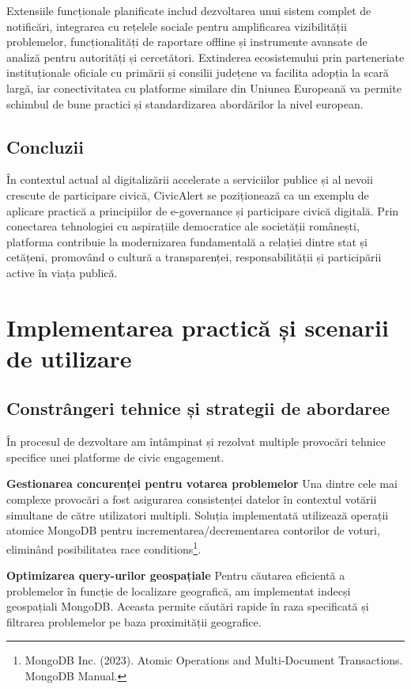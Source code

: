 \documentclass[12pt,a4paper]{report}
\begin{document}
Extensiile funcționale planificate includ dezvoltarea unui sistem complet de notificări, integrarea cu rețelele sociale pentru amplificarea vizibilității problemelor, funcționalități de raportare offline și instrumente avansate de analiză pentru autorități și cercetători. Extinderea ecosistemului prin parteneriate instituționale oficiale cu primării și consilii județene va facilita adopția la scară largă, iar conectivitatea cu platforme similare din Uniunea Europeană va permite schimbul de bune practici și standardizarea abordărilor la nivel european.

\section{Concluzii}

În contextul actual al digitalizării accelerate a serviciilor publice și al nevoii crescute de participare civică, CivicAlert se poziționează ca un exemplu de aplicare practică a principiilor de e-governance și participare civică digitală. Prin conectarea tehnologiei  cu aspirațiile democratice ale societății românești, platforma contribuie la modernizarea fundamentală a relației dintre stat și cetățeni, promovând o cultură a transparenței, responsabilității și participării active în viața publică.


\newpage
\chapter{Implementarea practică și scenarii de utilizare}


\section{Constrângeri tehnice și strategii de abordaree}

În procesul de dezvoltare am întâmpinat și rezolvat multiple provocări tehnice specifice unei platforme de civic engagement.

\textbf{Gestionarea concurenței pentru votarea problemelor}
Una dintre cele mai complexe provocări a fost asigurarea consistenței datelor în contextul votării simultane de către utilizatori multipli. Soluția implementată utilizează operații atomice MongoDB pentru incrementarea/decrementarea contorilor de voturi, eliminând posibilitatea race conditions\footnote{MongoDB Inc. (2023). Atomic Operations and Multi-Document Transactions. MongoDB Manual.}.

\textbf{Optimizarea query-urilor geospațiale}
Pentru căutarea eficientă a problemelor în funcție de localizare geografică, am implementat indecși geospațiali MongoDB. Aceasta permite căutări rapide în raza specificată și filtrarea problemelor pe baza proximității geografice.
\end{document}
